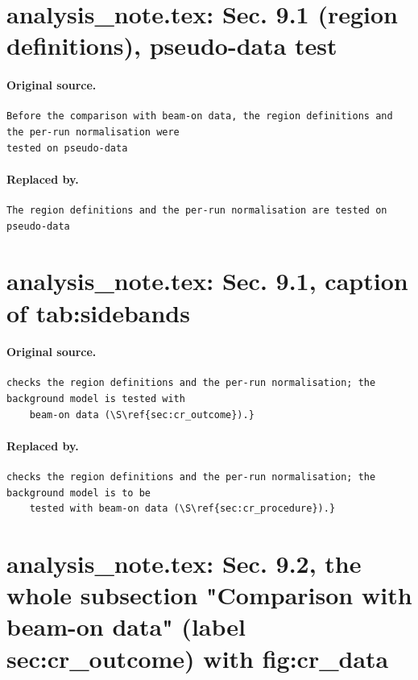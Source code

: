 \documentclass[11pt,a4paper]{article}
\begin{document}
\section{analysis\_note.tex: Sec. 9.1 (region definitions), pseudo-data test}
\paragraph{Original source.}
\begin{lstlisting}[language={[LaTeX]TeX},basicstyle=\ttfamily\footnotesize,columns=fullflexible]
Before the comparison with beam-on data, the region definitions and the per-run normalisation were
tested on pseudo-data
\end{lstlisting}
\paragraph{Replaced by.}
\begin{lstlisting}[language={[LaTeX]TeX},basicstyle=\ttfamily\footnotesize,columns=fullflexible]
The region definitions and the per-run normalisation are tested on pseudo-data
\end{lstlisting}

\section{analysis\_note.tex: Sec. 9.1, caption of tab:sidebands}
\paragraph{Original source.}
\begin{lstlisting}[language={[LaTeX]TeX},basicstyle=\ttfamily\footnotesize,columns=fullflexible]
checks the region definitions and the per-run normalisation; the background model is tested with
    beam-on data (\S\ref{sec:cr_outcome}).}
\end{lstlisting}
\paragraph{Replaced by.}
\begin{lstlisting}[language={[LaTeX]TeX},basicstyle=\ttfamily\footnotesize,columns=fullflexible]
checks the region definitions and the per-run normalisation; the background model is to be
    tested with beam-on data (\S\ref{sec:cr_procedure}).}
\end{lstlisting}

\section{analysis\_note.tex: Sec. 9.2, the whole subsection "Comparison with beam-on data" (label sec:cr\_outcome) with fig:cr\_data}
\end{document}
